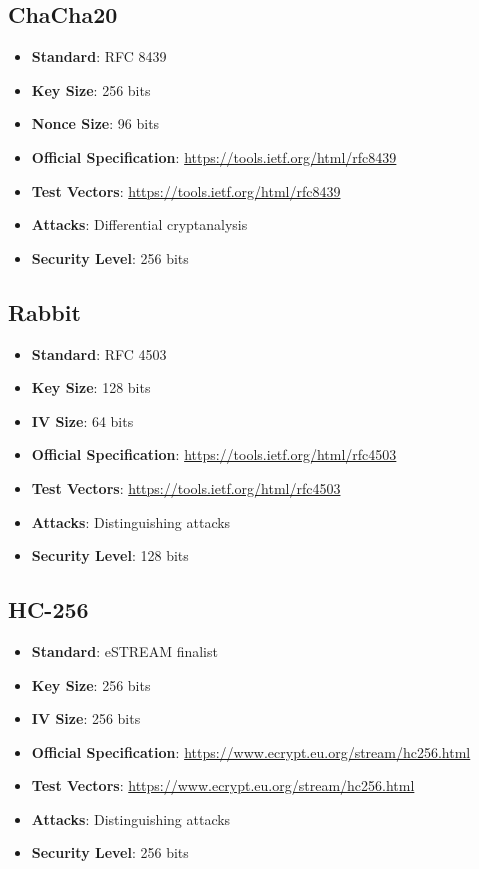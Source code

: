 \documentclass[11pt,a4paper]{article}
\begin{document}
\subsection{ChaCha20}
\begin{itemize}
    \item \textbf{Standard}: RFC 8439
    \item \textbf{Key Size}: 256 bits
    \item \textbf{Nonce Size}: 96 bits
    \item \textbf{Official Specification}: \url{https://tools.ietf.org/html/rfc8439}
    \item \textbf{Test Vectors}: \url{https://tools.ietf.org/html/rfc8439}
    \item \textbf{Attacks}: Differential cryptanalysis
    \item \textbf{Security Level}: 256 bits
\end{itemize}

\subsection{Rabbit}
\begin{itemize}
    \item \textbf{Standard}: RFC 4503
    \item \textbf{Key Size}: 128 bits
    \item \textbf{IV Size}: 64 bits
    \item \textbf{Official Specification}: \url{https://tools.ietf.org/html/rfc4503}
    \item \textbf{Test Vectors}: \url{https://tools.ietf.org/html/rfc4503}
    \item \textbf{Attacks}: Distinguishing attacks
    \item \textbf{Security Level}: 128 bits
\end{itemize}

\subsection{HC-256}
\begin{itemize}
    \item \textbf{Standard}: eSTREAM finalist
    \item \textbf{Key Size}: 256 bits
    \item \textbf{IV Size}: 256 bits
    \item \textbf{Official Specification}: \url{https://www.ecrypt.eu.org/stream/hc256.html}
    \item \textbf{Test Vectors}: \url{https://www.ecrypt.eu.org/stream/hc256.html}
    \item \textbf{Attacks}: Distinguishing attacks
    \item \textbf{Security Level}: 256 bits
\end{itemize}
\end{document}
